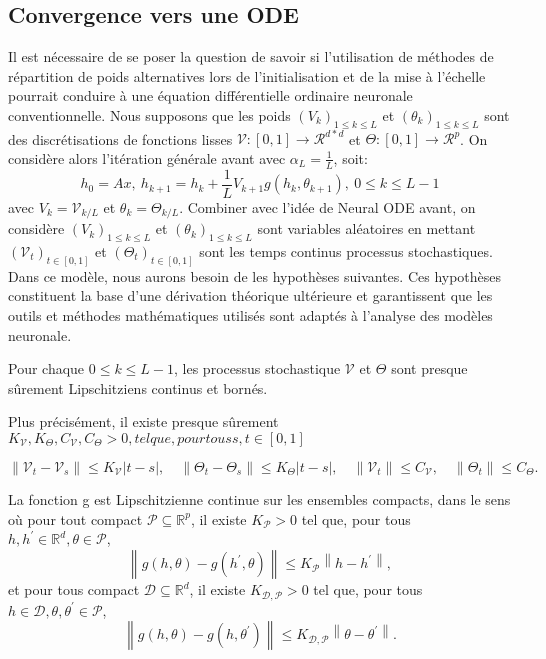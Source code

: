  \subsection{Convergence vers une ODE}
 Il est nécessaire de se poser la question de savoir si l'utilisation de méthodes de répartition de poids alternatives lors de l'initialisation et de la mise à l'échelle pourrait conduire à une équation différentielle ordinaire neuronale conventionnelle. Nous supposons que les poids $(V_k)_{1\leqslant k \leqslant L }$ et $(\theta_k)_{1\leqslant k \leqslant L }$ sont des discrétisations de fonctions lisses $\mathcal{V}:[0,1] \to \mathcal{R}^{d*d}$ et $\Theta:[0,1] \to \mathcal{R}^{p}$. On considère alors l’itération générale avant avec $\alpha_L = \frac{1}{L}$, soit:
 \begin{equation}
     h_0 = Ax,\ h_{k+1} = h_k + \frac{1}{L}V_{k+1}g(h_k,\theta_{k+1}),\ 0 \leqslant k \leqslant L-1
 \end{equation}
avec $V_k = \mathcal{V}_{k/L}$ et $\theta_k = \Theta_{k/L}$.
Combiner avec l'idée de Neural ODE avant, on considère $(V_k)_{1\leqslant k \leqslant L }$ et $(\theta_k)_{1\leqslant k \leqslant L }$ sont variables aléatoires en mettant $(\mathcal{V}_t)_{t \in [0,1]}$ et $(\Theta_t)_{t \in [0,1]}$ sont les temps continus
processus stochastiques. Dans ce modèle, nous aurons besoin de les hypothèses suivantes. Ces hypothèses constituent la base d'une dérivation théorique ultérieure et garantissent que les outils et méthodes mathématiques utilisés sont adaptés à l'analyse des modèles neuronale. 

\begin{assumption}\label{H5}
Pour chaque $0 \leqslant k \leqslant L-1$, les processus stochastique $\mathcal{V}$ et $\Theta$ sont presque sûrement Lipschitziens continus et bornés.
\end{assumption}

Plus précisément, il existe presque sûrement $K_{\mathscr{V}}, K_{\Theta}, C_{\mathscr{V}}, C_{\Theta}>0,tel que, pour tous s, t \in [0,1]$

$$
\left\|\mathscr{V}_t-\mathscr{V}_s\right\| \leqslant K_{\mathscr{V}}|t-s|, \quad\left\|\Theta_t-\Theta_s\right\| \leqslant K_{\Theta}|t-s|, \quad\left\|\mathscr{V}_t\right\| \leqslant C_{\mathscr{V}}, \quad\left\|\Theta_t\right\| \leqslant C_{\Theta} .
$$

\begin{assumption}\label{H6}
La fonction g est Lipschitzienne continue sur les ensembles compacts, dans le sens où pour tout compact $\mathscr{P} \subseteq \mathbb{R}^p$, il existe $K_{\mathscr{P}} > 0$  tel que, pour tous $h, h^{\prime} \in \mathbb{R}^d, \theta \in \mathscr{P}$,
$$
\left\|g(h, \theta)-g\left(h^{\prime}, \theta\right)\right\| \leqslant K_{\mathscr{P}}\left\|h-h^{\prime}\right\|,
$$
et pour tous compact $\mathscr{D} \subseteq \mathbb{R}^d$, il existe $K_{\mathscr{D}, \mathscr{P}}>0$ tel que, pour tous $h \in \mathscr{D}, \theta, \theta^{\prime} \in \mathscr{P}$,
$$
\left\|g(h, \theta)-g\left(h, \theta^{\prime}\right)\right\| \leqslant K_{\mathscr{D}, \mathscr{P}}\left\|\theta-\theta^{\prime}\right\| .
$$
\end{assumption}


